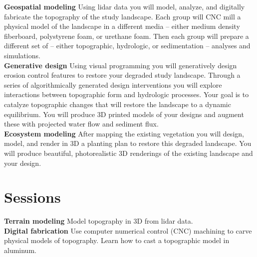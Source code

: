 \documentclass[11pt,article,oneside]{memoir}
\begin{document}

\noindent \textbf{Geospatial modeling}
Using lidar data you will model, analyze, and digitally fabricate
the topography of the study landscape. 
%
Each group will CNC mill a physical model of the landscape
in a different media -- either medium density fiberboard, 
polystyrene foam, or urethane foam.
Then each group will prepare a different set of 
-- either topographic, hydrologic, or sedimentation -- 
analyses and simulations.\\


\noindent \textbf{Generative design}
Using visual programming you will generatively design
erosion control features to restore your degraded study landscape.
Through a series of algorithmically generated design interventions 
you will explore interactions between 
topographic form and hydrologic processes.
Your goal is to catalyze topographic changes that will 
restore the landscape to a dynamic equilibrium.  
You will produce 3D printed models of your designs
and augment these with projected water flow and sediment flux. \\

\noindent \textbf{Ecosystem modeling}
After mapping the existing vegetation 
you will design, model, and render in 3D
a planting plan to restore this degraded landscape. 
You will produce beautiful, photorealistic 3D renderings  
of the existing landscape and your design. \\


\section{Sessions}

\renewcommand*{\bibfont}{\footnotesize}

\noindent \textbf{Terrain modeling}
Model topography in 3D from lidar data.\\

\noindent \textbf{Digital fabrication}
Use computer numerical control (CNC) machining 
to carve physical models of topography. 
Learn how to cast a topographic model
in aluminum.
%
\nocite{*} \printbibliography[keyword=fabrication, heading=none]
\vspace*{0.5em}
\end{document}
